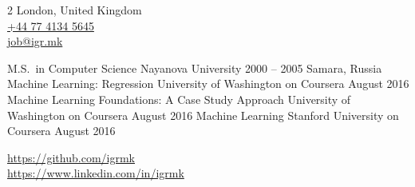 \documentclass[9pt,a4paper]{igrmkcv}
\begin{document}
\begin{paracol}{2}
    London, United Kingdom\\
    \href{tel:+447741345645}{+44 77 4134 5645}\\
    \href{mailto:job@igr.mk}{job@igr.mk}


    \vspace{0.3cm}

    \cvRightEvent
        {M.S.\ in Computer Science}
        {Nayanova University}
        {2000 -- 2005}
        {Samara, Russia}
    \cvRightEvent
        {Machine Learning: Regression}
        {University of Washington on Coursera}
        {August 2016}
        {}
    \cvRightEvent
        {Machine Learning Foundations: A Case Study Approach}
        {University of Washington on Coursera}
        {August 2016}
        {}
    \cvRightEvent
        {Machine Learning}
        {Stanford University on Coursera}
        {August 2016}
        {}


\href{https://github.com/igrmk}{https://github.com/igrmk}\\
\href{https://www.linkedin.com/in/igrmk}{https://www.linkedin.com/in/igrmk}

\end{paracol}
\end{document}
